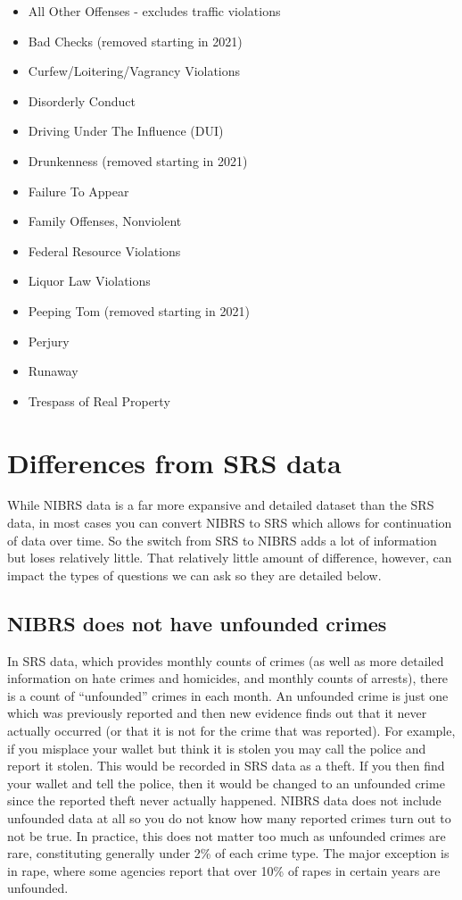 \documentclass[
]{krantz}
\providecommand{\tightlist}{%
  \setlength{\itemsep}{0pt}\setlength{\parskip}{0pt}}
\begin{document}
\begin{itemize}
\tightlist
\item
  All Other Offenses - excludes traffic violations
\item
  Bad Checks (removed starting in 2021)
\item
  Curfew/Loitering/Vagrancy Violations
\item
  Disorderly Conduct
\item
  Driving Under The Influence (DUI)
\item
  Drunkenness (removed starting in 2021)
\item
  Failure To Appear
\item
  Family Offenses, Nonviolent
\item
  Federal Resource Violations
\item
  Liquor Law Violations
\item
  Peeping Tom (removed starting in 2021)
\item
  Perjury
\item
  Runaway
\item
  Trespass of Real Property
\end{itemize}

\section{Differences from SRS
data}\label{differences-from-srs-data}

While NIBRS data is a far more expansive and detailed
dataset than the SRS data, in most cases you can convert
NIBRS to SRS which allows for continuation of data over
time. So the switch from SRS to NIBRS adds a lot of
information but loses relatively little. That relatively
little amount of difference, however, can impact the types
of questions we can ask so they are detailed below.

\subsection{NIBRS does not have unfounded
crimes}\label{nibrs-does-not-have-unfounded-crimes}

In SRS data, which provides monthly counts of crimes (as
well as more detailed information on hate crimes and
homicides, and monthly counts of arrests), there is a count
of ``unfounded'' crimes in each month. An unfounded crime is
just one which was previously reported and then new evidence
finds out that it never actually occurred (or that it is not
for the crime that was reported). For example, if you
misplace your wallet but think it is stolen you may call the
police and report it stolen. This would be recorded in SRS
data as a theft. If you then find your wallet and tell the
police, then it would be changed to an unfounded crime since
the reported theft never actually happened. NIBRS data does
not include unfounded data at all so you do not know how
many reported crimes turn out to not be true. In practice,
this does not matter too much as unfounded crimes are rare,
constituting generally under 2\% of each crime type. The
major exception is in rape, where some agencies report that
over 10\% of rapes in certain years are unfounded.
\end{document}
